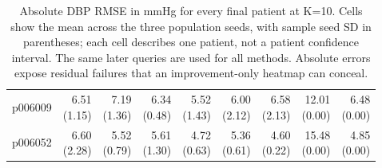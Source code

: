\documentclass[11pt]{article}
\begin{document}
\begin{table}[!htbp]
\begin{tabular}{lrrrrrrrr}
p006009 & \shortstack{6.51\\(1.15)} & \shortstack{7.19\\(1.36)} & \shortstack{6.34\\(0.48)} & \shortstack{5.52\\(1.43)} & \shortstack{6.00\\(2.12)} & \shortstack{6.58\\(2.13)} & \shortstack{12.01\\(0.00)} & \shortstack{6.48\\(0.00)}\\
p006052 & \shortstack{6.60\\(2.28)} & \shortstack{5.52\\(0.79)} & \shortstack{5.61\\(1.30)} & \shortstack{4.72\\(0.63)} & \shortstack{5.36\\(0.61)} & \shortstack{4.60\\(0.22)} & \shortstack{15.48\\(0.00)} & \shortstack{4.85\\(0.00)}\\
\bottomrule\end{tabular}
\caption{Absolute DBP RMSE in mmHg for every final patient at K=10. Cells show the mean across the three population seeds, with sample seed SD in parentheses; each cell describes one patient, not a patient confidence interval. The same later queries are used for all methods. Absolute errors expose residual failures that an improvement-only heatmap can conceal.}\end{table}
\end{document}
